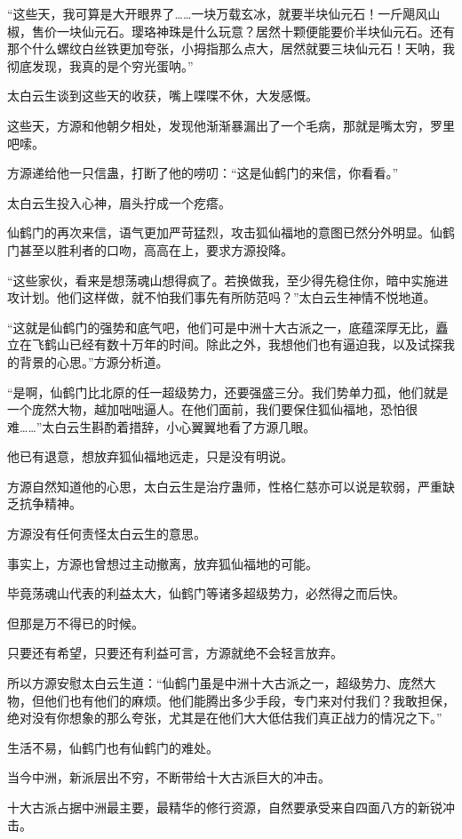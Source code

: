 \begin{this_body}
“这些天，我可算是大开眼界了……一块万载玄冰，就要半块仙元石！一斤飓风山椒，售价一块仙元石。璎珞神珠是什么玩意？居然十颗便能要价半块仙元石。还有那个什么螺纹白丝铁更加夸张，小拇指那么点大，居然就要三块仙元石！天呐，我彻底发现，我真的是个穷光蛋呐。”

太白云生谈到这些天的收获，嘴上喋喋不休，大发感慨。

这些天，方源和他朝夕相处，发现他渐渐暴漏出了一个毛病，那就是嘴太穷，罗里吧嗦。

方源递给他一只信蛊，打断了他的唠叨：“这是仙鹤门的来信，你看看。”

太白云生投入心神，眉头拧成一个疙瘩。

仙鹤门的再次来信，语气更加严苛猛烈，攻击狐仙福地的意图已然分外明显。仙鹤门甚至以胜利者的口吻，高高在上，要求方源投降。

“这些家伙，看来是想荡魂山想得疯了。若换做我，至少得先稳住你，暗中实施进攻计划。他们这样做，就不怕我们事先有所防范吗？”太白云生神情不悦地道。

“这就是仙鹤门的强势和底气吧，他们可是中洲十大古派之一，底蕴深厚无比，矗立在飞鹤山已经有数十万年的时间。除此之外，我想他们也有逼迫我，以及试探我的背景的心思。”方源分析道。

“是啊，仙鹤门比北原的任一超级势力，还要强盛三分。我们势单力孤，他们就是一个庞然大物，越加咄咄逼人。在他们面前，我们要保住狐仙福地，恐怕很难……”太白云生斟酌着措辞，小心翼翼地看了方源几眼。

他已有退意，想放弃狐仙福地远走，只是没有明说。

方源自然知道他的心思，太白云生是治疗蛊师，性格仁慈亦可以说是软弱，严重缺乏抗争精神。

方源没有任何责怪太白云生的意思。

事实上，方源也曾想过主动撤离，放弃狐仙福地的可能。

毕竟荡魂山代表的利益太大，仙鹤门等诸多超级势力，必然得之而后快。

但那是万不得已的时候。

只要还有希望，只要还有利益可言，方源就绝不会轻言放弃。

所以方源安慰太白云生道：“仙鹤门虽是中洲十大古派之一，超级势力、庞然大物，但他们也有他们的麻烦。他们能腾出多少手段，专门来对付我们？我敢担保，绝对没有你想象的那么夸张，尤其是在他们大大低估我们真正战力的情况之下。”

生活不易，仙鹤门也有仙鹤门的难处。

当今中洲，新派层出不穷，不断带给十大古派巨大的冲击。

十大古派占据中洲最主要，最精华的修行资源，自然要承受来自四面八方的新锐冲击。


\end{this_body}

